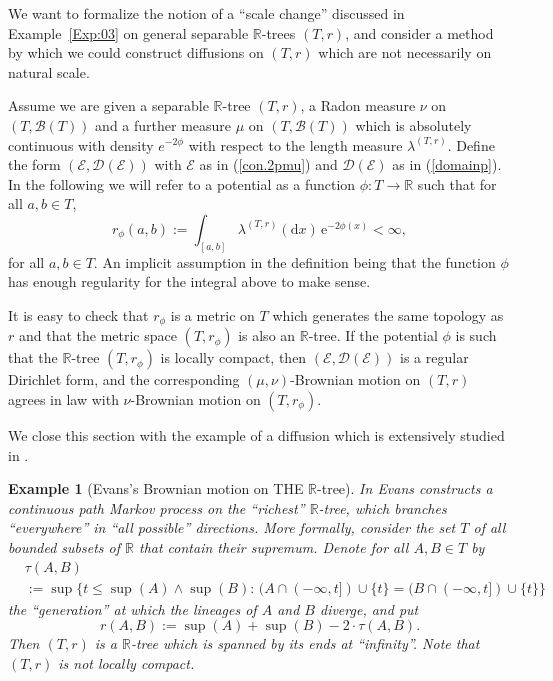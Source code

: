 \documentclass[11pt]{amsart}
\numberwithin{equation}{section}
\newtheorem{example}[definition]{Example}
\begin{document}
{We want to formalize the notion of a ``scale change'' discussed in Example~\ref{Exp:03} on general separable ${{\mathbb R}}$-trees $(T,r)$, and consider a method by which
we could construct diffusions on $(T,r)$ which are not necessarily on natural scale.

Assume we are given a separable ${{\mathbb R}}$-tree $(T,r)$, a Radon measure $\nu$ on $(T,{\mathcal B}(T))$ and a further measure $\mu$ on  $(T,{\mathcal B}(T))$ which is absolutely continuous {with density $e^{-2\phi}$} with respect to the length measure $\lambda^{(T,r)}$. Define the form $({\mathcal E},{\mathcal D({\mathcal E})})$ with ${\mathcal E}$ as in (\ref{con.2pmu}) and ${\mathcal D}({\mathcal E})$ as in (\ref{domainp}).
In the following we will refer to a {{\it} potential} as a function $\phi:T\to{{\mathbb R}}$ such that {for all $a,b\in T$,}
\begin{equation}\label{e:rphi}
   r_\phi(a,b)
 :=
   \int_{[a,b]}\lambda^{(T,r)}(\mathrm{d}x)\,\mathrm e^{-2\phi(x)}<\infty,
\end{equation}
for all $a,b\in T$. An implicit assumption in the definition being that the function $\phi$ has enough regularity for the integral above to make sense.

It is easy to check that $r_\phi$ is a metric on $T$
which generates the same topology
as $r$ and that the metric space $(T,r_\phi)$ is
also an ${{\mathbb R}}$-tree.
If the potential $\phi$ is such that
the ${{\mathbb R}}$-tree $(T,r_\phi)$ is locally compact,
then $({\mathcal E},{\mathcal D}({\mathcal E}))$ is a regular Dirichlet form, and the corresponding
$(\mu,\nu)$-Brownian motion on $(T,r)$ agrees in law with
$\nu$-Brownian motion on $(T,r_\phi)$. {\smallskip}

We close this section with the example of a diffusion which is extensively studied in \cite{Eva00}.
\begin{example}[Evans's Brownian motion on THE ${{\mathbb R}}$-tree] \rm
In \cite{Eva00} Evans constructs a continuous path Markov process on the ``richest'' ${{\mathbb R}}$-tree, which branches ``everywhere'' in ``all possible'' directions. More formally, consider the set $T$ of all bounded subsets of ${{\mathbb R}}$ that contain their supremum. Denote for all $A,B\in T$ by
\label{Exp:06}
\begin{equation}
\begin{aligned}
   &\tau(A,B)
  \\
 &:=
   \sup\big\{t\le \sup(A)\wedge\sup(B):\,(A\cap(-\infty,t])\cup\{t\}=(B\cap(-\infty,t])\cup\{t\}\big\}
\end{aligned}
\end{equation}
the ``generation'' at which the lineages of $A$ and $B$ diverge, and put
\begin{equation}
   r(A,B)
 :=
   \sup(A)+\sup(B)-2\cdot\tau(A,B).
\end{equation}
Then $(T,r)$ is a ${{\mathbb R}}$-tree which is spanned by its ends at ``infinity''. Note that $(T,r)$ is not locally compact.


\end{example}}
\end{document}

